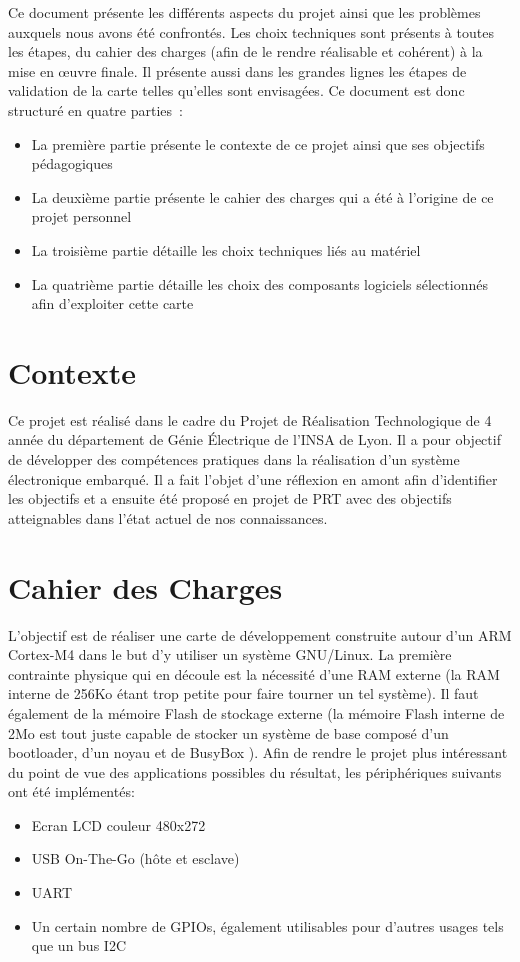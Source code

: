 Ce document présente les différents aspects du projet ainsi que les problèmes auxquels nous avons été confrontés.
Les choix techniques sont présents à toutes les étapes, du cahier des charges (afin de le rendre réalisable et cohérent) à la mise en œuvre finale.
Il présente aussi dans les grandes lignes les étapes de validation de la carte telles qu'elles sont envisagées.
Ce document est donc structuré en quatre parties~:
\begin{itemize}
	\item La première partie présente le contexte de ce projet ainsi que ses objectifs pédagogiques
	\item La deuxième partie présente le cahier des charges qui a été à l'origine de ce projet personnel
	\item La troisième partie détaille les choix techniques liés au matériel
	\item La quatrième partie détaille les choix des composants logiciels sélectionnés afin d'exploiter cette carte
\end{itemize}
    
\section{Contexte}
Ce projet est réalisé dans le cadre du Projet de Réalisation Technologique de 4\ieme{} année du département de Génie Électrique de l'INSA de Lyon.
Il a pour objectif de développer des compétences pratiques dans la réalisation d'un système électronique embarqué.
Il a fait l'objet d'une réflexion en amont afin d'identifier les objectifs et a ensuite été proposé en projet de PRT avec des objectifs atteignables dans l'état actuel de nos connaissances.
    
\section{Cahier des Charges}
L'objectif est de réaliser une carte de développement construite autour d'un ARM Cortex-M4 dans le but d'y utiliser un système GNU/Linux.
La première contrainte physique qui en découle est la nécessité d'une RAM externe (la RAM interne de 256Ko étant trop petite pour faire tourner un tel système).
Il faut également de la mémoire Flash de stockage externe (la mémoire Flash interne de 2Mo est tout juste capable de stocker un système de base composé d'un bootloader, d'un noyau et de BusyBox \autocite{BusyBox}).
Afin de rendre le projet plus intéressant du point de vue des applications possibles du résultat, les périphériques suivants ont été implémentés:
\begin{itemize}
	\item Ecran LCD couleur 480x272
	\item USB On-The-Go (hôte et esclave)
	\item UART
	\item Un certain nombre de \glspl{GPIO}, également utilisables pour d'autres usages tels que un bus I2C
\end{itemize}

